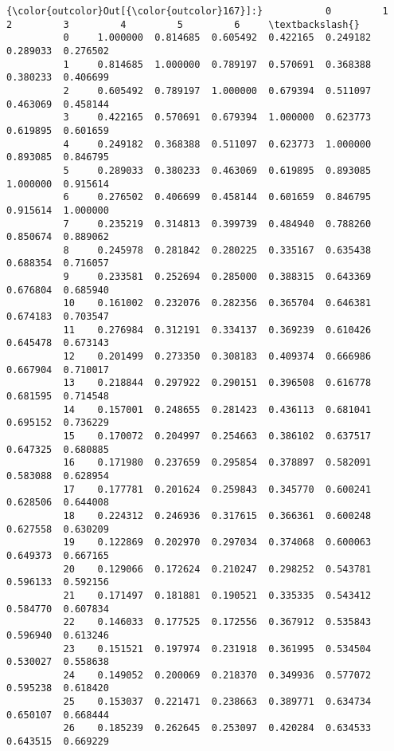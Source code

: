 \documentclass[11pt]{article}
\begin{document}
\begin{Verbatim}[commandchars=\\\{\}]
{\color{outcolor}Out[{\color{outcolor}167}]:}           0         1         2         3         4         5         6     \textbackslash{}
          0     1.000000  0.814685  0.605492  0.422165  0.249182  0.289033  0.276502   
          1     0.814685  1.000000  0.789197  0.570691  0.368388  0.380233  0.406699   
          2     0.605492  0.789197  1.000000  0.679394  0.511097  0.463069  0.458144   
          3     0.422165  0.570691  0.679394  1.000000  0.623773  0.619895  0.601659   
          4     0.249182  0.368388  0.511097  0.623773  1.000000  0.893085  0.846795   
          5     0.289033  0.380233  0.463069  0.619895  0.893085  1.000000  0.915614   
          6     0.276502  0.406699  0.458144  0.601659  0.846795  0.915614  1.000000   
          7     0.235219  0.314813  0.399739  0.484940  0.788260  0.850674  0.889062   
          8     0.245978  0.281842  0.280225  0.335167  0.635438  0.688354  0.716057   
          9     0.233581  0.252694  0.285000  0.388315  0.643369  0.676804  0.685940   
          10    0.161002  0.232076  0.282356  0.365704  0.646381  0.674183  0.703547   
          11    0.276984  0.312191  0.334137  0.369239  0.610426  0.645478  0.673143   
          12    0.201499  0.273350  0.308183  0.409374  0.666986  0.667904  0.710017   
          13    0.218844  0.297922  0.290151  0.396508  0.616778  0.681595  0.714548   
          14    0.157001  0.248655  0.281423  0.436113  0.681041  0.695152  0.736229   
          15    0.170072  0.204997  0.254663  0.386102  0.637517  0.647325  0.680885   
          16    0.171980  0.237659  0.295854  0.378897  0.582091  0.583088  0.628954   
          17    0.177781  0.201624  0.259843  0.345770  0.600241  0.628506  0.644008   
          18    0.224312  0.246936  0.317615  0.366361  0.600248  0.627558  0.630209   
          19    0.122869  0.202970  0.297034  0.374068  0.600063  0.649373  0.667165   
          20    0.129066  0.172624  0.210247  0.298252  0.543781  0.596133  0.592156   
          21    0.171497  0.181881  0.190521  0.335335  0.543412  0.584770  0.607834   
          22    0.146033  0.177525  0.172556  0.367912  0.535843  0.596940  0.613246   
          23    0.151521  0.197974  0.231918  0.361995  0.534504  0.530027  0.558638   
          24    0.149052  0.200069  0.218370  0.349936  0.577072  0.595238  0.618420   
          25    0.153037  0.221471  0.238663  0.389771  0.634734  0.650107  0.668444   
          26    0.185239  0.262645  0.253097  0.420284  0.634533  0.643515  0.669229   

\end{Verbatim}
\end{document}
